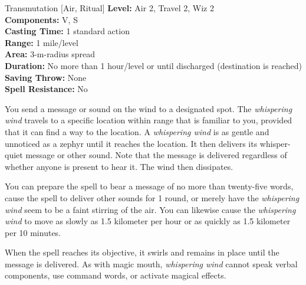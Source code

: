 {Transmutation [Air, Ritual]}
{
	\textbf{Level:}
	Air 2, Travel 2, Wiz 2\\
	\textbf{Components:}
	V, S\\
	\textbf{Casting Time:}
	1 standard action\\
	\textbf{Range:}
	1 mile/level\\
	\textbf{Area:}
	3-m-radius spread\\
	\textbf{Duration:}
	No more than 1 hour/level or until discharged (destination is reached)\\
	\textbf{Saving Throw:}
	None\\
	\textbf{Spell Resistance:}
	No\\
}
{
	You send a message or sound on the wind to a designated spot. The \emph{whispering wind} travels to a specific location within range that is familiar to you, provided that it can find a way to the location. A \emph{whispering wind} is as gentle and unnoticed as a zephyr until it reaches the location. It then delivers its whisper-quiet message or other sound. Note that the message is delivered regardless of whether anyone is present to hear it. The wind then dissipates.

	You can prepare the spell to bear a message of no more than twenty-five words, cause the spell to deliver other sounds for 1 round, or merely have the \emph{whispering wind} seem to be a faint stirring of the air. You can likewise cause the \emph{whispering wind} to move as slowly as 1.5 kilometer per hour or as quickly as 1.5 kilometer per 10 minutes.

	When the spell reaches its objective, it swirls and remains in place until the message is delivered. As with magic mouth, \emph{whispering wind} cannot speak verbal components, use command words, or activate magical effects.

}
